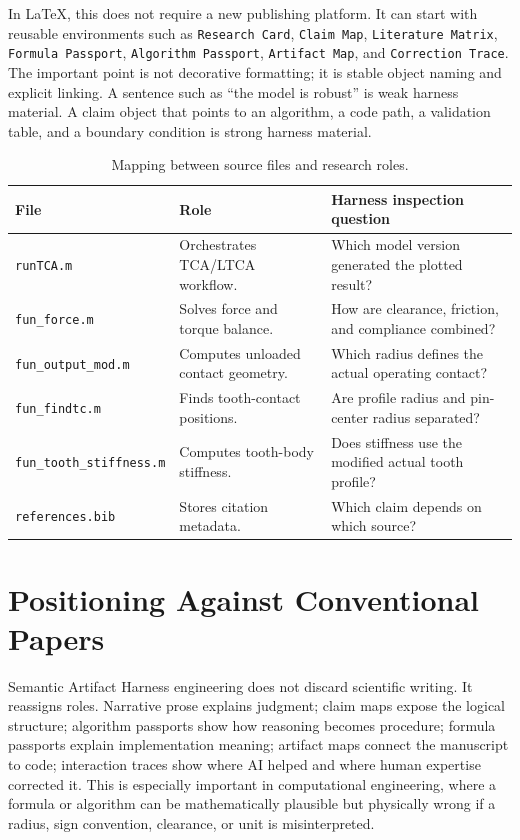 \documentclass{article}
\begin{document}
In LaTeX, this does not require a new publishing platform. It can start with reusable environments such as \texttt{Research Card}, \texttt{Claim Map}, \texttt{Literature Matrix}, \texttt{Formula Passport}, \texttt{Algorithm Passport}, \texttt{Artifact Map}, and \texttt{Correction Trace}. The important point is not decorative formatting; it is stable object naming and explicit linking. A sentence such as ``the model is robust'' is weak harness material. A claim object that points to an algorithm, a code path, a validation table, and a boundary condition is strong harness material.

\begin{table}[t]
\caption{Mapping between source files and research roles.}
\centering
\small
\begin{tabular}{p{3.0cm}p{4.3cm}p{6.1cm}}
\toprule
\textbf{File} & \textbf{Role} & \textbf{Harness inspection question} \\
\midrule
\texttt{runTCA.m} & Orchestrates TCA/LTCA workflow. & Which model version generated the plotted result? \\
\texttt{fun\_force.m} & Solves force and torque balance. & How are clearance, friction, and compliance combined? \\
\texttt{fun\_output\_mod.m} & Computes unloaded contact geometry. & Which radius defines the actual operating contact? \\
\texttt{fun\_findtc.m} & Finds tooth-contact positions. & Are profile radius and pin-center radius separated? \\
\texttt{fun\_tooth\_}\newline\texttt{stiffness.m} & Computes tooth-body stiffness. & Does stiffness use the modified actual tooth profile? \\
\texttt{references.bib} & Stores citation metadata. & Which claim depends on which source? \\
\bottomrule
\end{tabular}
\label{tab:filemap}
\end{table}

\section{Positioning Against Conventional Papers}

Semantic Artifact Harness engineering does not discard scientific writing. It reassigns roles. Narrative prose explains judgment; claim maps expose the logical structure; algorithm passports show how reasoning becomes procedure; formula passports explain implementation meaning; artifact maps connect the manuscript to code; interaction traces show where AI helped and where human expertise corrected it. This is especially important in computational engineering, where a formula or algorithm can be mathematically plausible but physically wrong if a radius, sign convention, clearance, or unit is misinterpreted.
\end{document}
